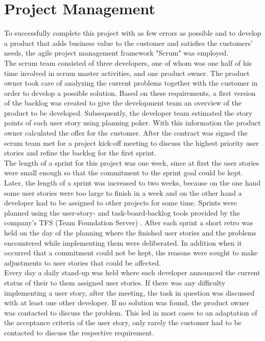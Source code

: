 \documentclass[Bachelor,BIF,english]{twbook}
\begin{document}
\section{Project Management}
To successfully complete this project with as few errors as possible and to develop a product that adds business value to the customer and satisfies the customers' needs, the agile project management framework "Scrum" \cite{Scrum} was employed. 
\\[\baselineskip]
The scrum team consisted of three developers, one of whom was one half of his time involved in scrum master activities, and one product owner. The product owner took care of analyzing the current problems together with the customer in order to develop a possible solution. Based on these requirements, a first version of the backlog was created to give the development team an overview of the product to be developed. Subsequently, the developer team estimated the story points of each user story using planning poker. With this information the product owner calculated the offer for the customer. After the contract was signed the scrum team met for a project kick-off meeting to discuss the highest priority user stories and refine the backlog for the first sprint.
\\[\baselineskip]
The length of a sprint for this project was one week, since at first the user stories were small enough so that the commitment to the sprint goal could be kept. Later, the length of a sprint was increased to two weeks, because on the one hand some user stories were too large to finish in a week and on the other hand a developer had to be assigned to other projects for some time. Sprints were planned using the user-story- and task-board-backlog tools provided by the company's TFS (Team Foundation Server) \cite{TFS}. After each sprint a short retro was held on the day of the planning where the finished user stories and the problems encountered while implementing them were deliberated. In addition when it occurred that a commitment could not be kept, the reasons were sought to make adjustments to user stories that could be affected. 
\\[\baselineskip]
Every day a daily stand-up was held where each developer announced the current status of their to them assigned user stories. If there was any difficulty implementing a user story, after the meeting, the task in question was discussed with at least one other developer. If no solution was found, the product owner was contacted to discuss the problem. This led in most cases to an adaptation of the acceptance criteria of the user story, only rarely the customer had to be contacted to discuss the respective requirement. 
\end{document}
